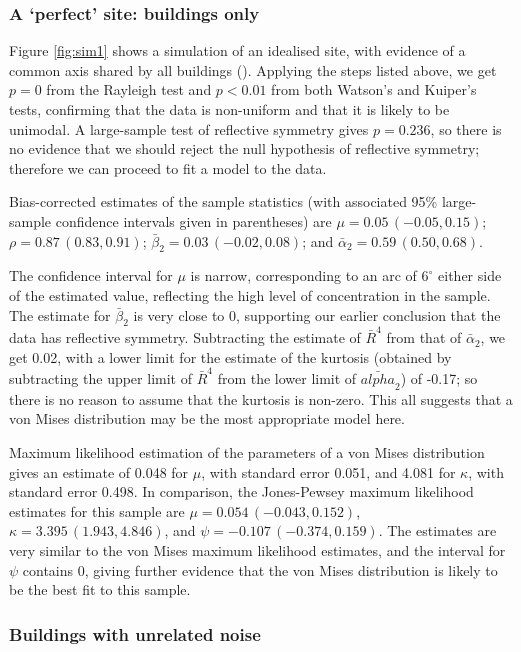 \documentclass[../../ArchStats.tex]{subfiles}
\begin{document}
\subsubsection{A `perfect' site: buildings only}

Figure \ref{fig:sim1} shows a simulation of an idealised site, with evidence of a common axis shared by all buildings (). Applying the steps listed above, we get $p = 0$ from the Rayleigh test and $p < 0.01$ from both Watson's and Kuiper's tests, confirming that the data is non-uniform and that it is likely to be unimodal. A large-sample test of reflective symmetry gives  $p=0.236$, so there is no evidence that we should reject the null hypothesis of reflective symmetry; therefore we can proceed to fit a model to the data.

Bias-corrected estimates of the sample statistics (with associated 95\% large-sample confidence intervals given in parentheses) are $\mu = 0.05 \, (-0.05, 0.15)$; $\rho = 0.87 \, (0.83, 0.91)$; $\bar{\beta}_2 = 0.03 \, (-0.02, 0.08)$; and $\bar{\alpha}_2 = 0.59 \, (0.50,  0.68)$. 

The confidence interval for $\mu$ is narrow, corresponding to an arc of $6^\circ$ either side of the estimated value, reflecting the high level of concentration in the sample. The estimate for $\bar{\beta}_2$ is very close to 0, supporting our earlier conclusion that the data has reflective symmetry. Subtracting the estimate of $\bar{R}^4$ from that of $\bar{\alpha}_2$, we get 0.02, with a lower limit for the estimate of the kurtosis (obtained by subtracting the upper limit of $\bar{R}^4$ from the lower limit of $\bar{alpha}_2$) of -0.17; so there is no reason to assume that the kurtosis is non-zero. This all suggests that a von Mises distribution may be the most appropriate model here.

Maximum likelihood estimation of the parameters of a von Mises distribution gives an estimate of 0.048 for $\mu$, with standard error 0.051, and 4.081 for $\kappa$, with standard error 0.498. In comparison, the Jones-Pewsey maximum likelihood estimates for this sample are $\mu = 0.054 \,(-0.043, 0.152)$, $\kappa = 3.395 \,(1.943, 4.846)$, and $\psi = -0.107 \,(-0.374, 0.159)$. The estimates are very similar to the von Mises maximum likelihood estimates, and the interval for $\psi$ contains 0, giving further evidence that the von Mises distribution is likely to be the best fit to this sample.


\subsubsection{Buildings with unrelated noise}
\end{document}
